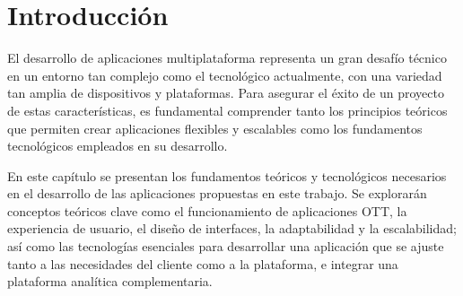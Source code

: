 \section{Introducción}
\label{sec:introduccion_fundamentos}
El desarrollo de aplicaciones multiplataforma representa un gran desafío técnico en un entorno
tan complejo como el tecnológico actualmente, con una variedad tan amplia de dispositivos y plataformas.
Para asegurar el éxito de un proyecto de estas características, es fundamental comprender tanto los principios 
teóricos que permiten crear aplicaciones flexibles y escalables como los fundamentos tecnológicos empleados 
en su desarrollo.

En este capítulo se presentan los fundamentos teóricos y tecnológicos necesarios en el desarrollo de 
las aplicaciones propuestas en este trabajo. Se explorarán conceptos teóricos clave como el funcionamiento 
de aplicaciones OTT, la experiencia de usuario, el diseño de interfaces, la adaptabilidad y la escalabilidad; 
así como las tecnologías esenciales para desarrollar una aplicación que se ajuste tanto a las necesidades del 
cliente como a la plataforma, e integrar una plataforma analítica complementaria.